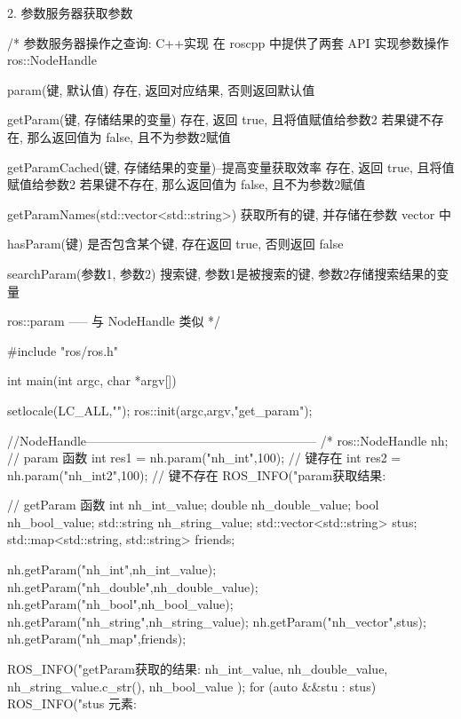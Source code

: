 \documentclass[openany, fontset=windowsold]{ctexbook}
\theoremstyle{kaiti}
\theoremstyle{normal}
\begin{document}
2. 参数服务器获取参数

\begin{cpp}
  /*
      参数服务器操作之查询: C++实现
      在 roscpp 中提供了两套 API 实现参数操作
      ros::NodeHandle

          param(键, 默认值) 
              存在, 返回对应结果, 否则返回默认值

          getParam(键, 存储结果的变量)
              存在, 返回 true, 且将值赋值给参数2
              若果键不存在, 那么返回值为 false, 且不为参数2赋值

          getParamCached(键, 存储结果的变量)--提高变量获取效率
              存在, 返回 true, 且将值赋值给参数2
              若果键不存在, 那么返回值为 false, 且不为参数2赋值

          getParamNames(std::vector<std::string>)
              获取所有的键, 并存储在参数 vector 中 

          hasParam(键)
              是否包含某个键, 存在返回 true, 否则返回 false

          searchParam(参数1, 参数2)
              搜索键, 参数1是被搜索的键, 参数2存储搜索结果的变量

      ros::param ----- 与 NodeHandle 类似
  */

  #include "ros/ros.h"

  int main(int argc, char *argv[])
  {
      setlocale(LC_ALL,"");
      ros::init(argc,argv,"get_param");

      //NodeHandle--------------------------------------------------------
      /*
      ros::NodeHandle nh;
      // param 函数
      int res1 = nh.param("nh_int",100); // 键存在
      int res2 = nh.param("nh_int2",100); // 键不存在
      ROS_INFO("param获取结果:%

      // getParam 函数
      int nh_int_value;
      double nh_double_value;
      bool nh_bool_value;
      std::string nh_string_value;
      std::vector<std::string> stus;
      std::map<std::string, std::string> friends;

      nh.getParam("nh_int",nh_int_value);
      nh.getParam("nh_double",nh_double_value);
      nh.getParam("nh_bool",nh_bool_value);
      nh.getParam("nh_string",nh_string_value);
      nh.getParam("nh_vector",stus);
      nh.getParam("nh_map",friends);

      ROS_INFO("getParam获取的结果:%
              nh_int_value,
              nh_double_value,
              nh_string_value.c_str(),
              nh_bool_value
              );
      for (auto &&stu : stus)
      {
          ROS_INFO("stus 元素:%
      }

}
\end{cpp}
\end{document}

